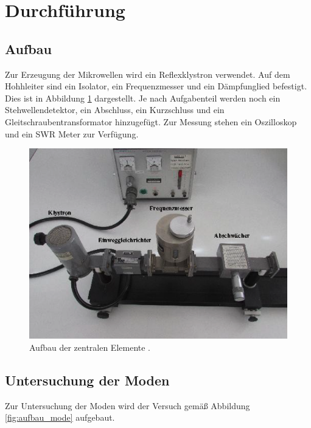 \section{Durchführung}
\label{sec:Durchführung}

\subsection{Aufbau}
\label{subsec:aufbau}

Zur Erzeugung der Mikrowellen wird ein Reflexklystron verwendet. Auf dem Hohhleiter
sind ein Isolator, ein Frequenzmesser und ein Dämpfunglied befestigt. Dies ist
in Abbildung \ref{fig:aufbau} dargestellt. Je nach
Aufgabenteil werden noch ein Stehwellendetektor, ein Abschluss, ein Kurzschluss
und ein Gleitschraubentransformator hinzugefügt. Zur Messung stehen ein Oszilloskop
und ein SWR Meter zur Verfügung.
\begin{figure}
  \centering
  \includegraphics[width=\textwidth]{data/Aufbau.png}
  \caption{Aufbau der zentralen Elemente \cite{Versuchsanleitung_neu}.}
  \label{fig:aufbau}
\end{figure}


\subsection{Untersuchung der Moden}
\label{subsec:moden}
Zur Untersuchung der Moden wird der Versuch gemäß Abbildung \ref{fig:aufbau_mode}
aufgebaut.

